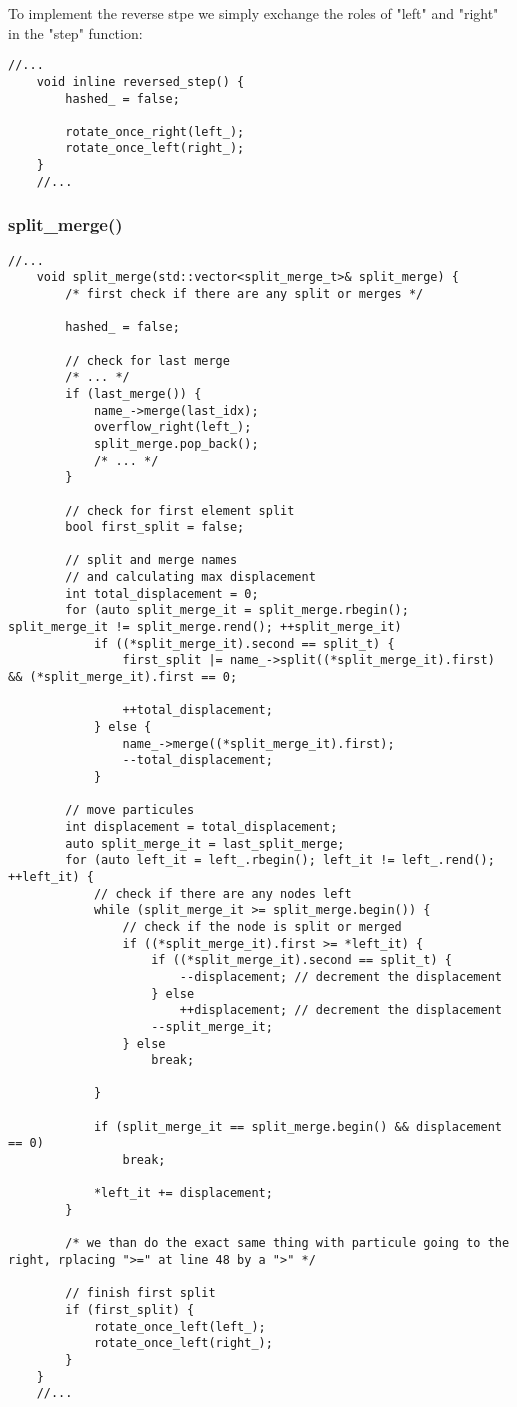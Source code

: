 \documentclass[11pt]{article}
\begin{document}
To implement the reverse stpe we simply exchange the roles of "left" and "right" in the "step" function:

\begin{lstlisting}[style=CStyle]
	//...
  	void inline reversed_step() {
  		hashed_ = false;

  		rotate_once_right(left_);
  		rotate_once_left(right_);
  	}
  	//...
\end{lstlisting}

\subsubsection{split\_merge()}

\begin{lstlisting}[style=CStyle]
	//...
	void split_merge(std::vector<split_merge_t>& split_merge) {
		/* first check if there are any split or merges */
		
		hashed_ = false;

		// check for last merge 
		/* ... */
		if (last_merge()) {
			name_->merge(last_idx);
			overflow_right(left_);
			split_merge.pop_back();
			/* ... */
		}
			
		// check for first element split 
		bool first_split = false;

		// split and merge names 
		// and calculating max displacement 
		int total_displacement = 0;
		for (auto split_merge_it = split_merge.rbegin(); split_merge_it != split_merge.rend(); ++split_merge_it)
			if ((*split_merge_it).second == split_t) {
				first_split |= name_->split((*split_merge_it).first) && (*split_merge_it).first == 0;

				++total_displacement;
			} else {
				name_->merge((*split_merge_it).first);
				--total_displacement;
			}

		// move particules 
		int displacement = total_displacement;
		auto split_merge_it = last_split_merge;
		for (auto left_it = left_.rbegin(); left_it != left_.rend(); ++left_it) {
			// check if there are any nodes left 
			while (split_merge_it >= split_merge.begin()) {
				// check if the node is split or merged 
				if ((*split_merge_it).first >= *left_it) {
					if ((*split_merge_it).second == split_t) {
						--displacement; // decrement the displacement 
					} else
						++displacement; // decrement the displacement 
					--split_merge_it;
				} else
					break;

			}

			if (split_merge_it == split_merge.begin() && displacement == 0)
				break;

			*left_it += displacement;
		}

		/* we than do the exact same thing with particule going to the right, rplacing ">=" at line 48 by a ">" */
		
		// finish first split 
		if (first_split) {
			rotate_once_left(left_);
			rotate_once_left(right_);
		}
	}
	//...
\end{lstlisting}
\end{document}
